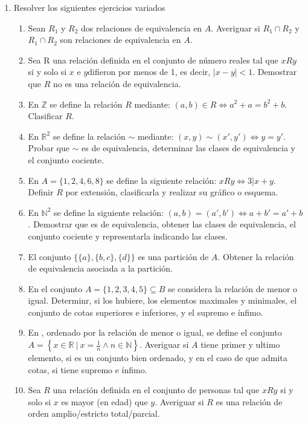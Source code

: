 \documentclass[a4paper]{article}
\newcommand{\exercise}{\item}
\newcommand{\Eq}{\Leftrightarrow}
\begin{document}
\begin{enumerate}
\begin{enumerate} [label=(\alph*)]
	\end{enumerate}
	\exercise Resolver los siguientes ejercicios variados
	\begin{enumerate} [label=(\alph*)]
		\item Sean $R_1$ y $R_2$ dos relaciones de equivalencia en $A$. Averiguar si $R_1 \cap R_2$ y $R_1 \cap R_2$ son relaciones de equivalencia en $A$.
		\item Sea R una relación definida en el conjunto de número reales tal que $x R y$ si y solo si $x$ e $y$difieron por menos de 1, es decir, $|x-y|<1$. Demostrar que $R$ no es una relación de equivalencia.
		\item En $\mathbb{Z}$ se define la relación $R$ mediante: $(a,b) \in R \Eq a^2+a=b^2+b$. Clasificar $R$.
		\item En $\mathbb{R}^2$ se define la relación $\sim$ mediante: $(x,y) \sim (x',y') \Eq y=y'$. Probar que $\sim$ es de equivalencia, determinar las clases de equivalencia y el conjunto cociente.
		\item En $A=\{1,2,4,6,8\}$ se define la siguiente relación: $xRy \Eq 3|x+y$. Definir $R$ por extensión, clasificarla y realizar su gráfico o esquema.
		\item En $\mathbb{N}^2$ se define la siguiente relación: $(a,b)=(a',b') \Eq a+b'=a'+b$. Demostrar que es de equivalencia, obtener las clases de equivalencia, el conjunto cociente y representarla indicando las clases.
		\item El conjunto $\{\{a\},\{b,c\},\{d\}\}$ es una partición de $A$. Obtener la relación de equivalencia asociada a la partición.
		\item En el conjunto $A=\{1,2,3,4,5\} \subseteq B$ se considera la relación de menor o igual. Determinr, si los hubiere, los elementos maximales y minimales, el conjunto de cotas superiores e inferiores, y el supremo e ínfimo.
		\item En , ordenado por la relación de menor o igual, se define el conjunto $A=\left\{ x \in \mathbb{R} ~|~ x=\frac{1}{n} \land n\in \mathbb{N} \right\}$. Averiguar si $A$ tiene primer y ultimo elemento, si es un conjunto bien ordenado, y en el caso de que admita cotas, si tiene supremo e ínfimo.
		\item Sea $R$ una relación definida en el conjunto de personas tal que $xRy$ si y solo si $x$ es mayor (en edad) que $y$. Averiguar si $R$ es una relación de orden amplio/estricto total/parcial.

\end{enumerate}
\end{enumerate}
\end{document}

